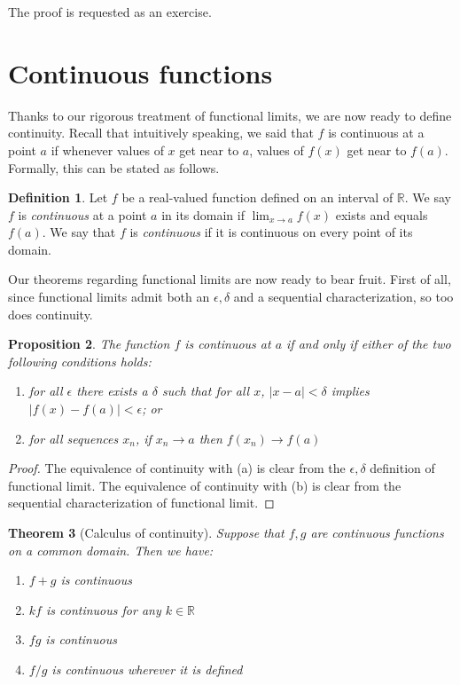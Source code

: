 \documentclass[11pt,oneside]{amsbook}
\newcommand{\RR}{\mathbb R}
\theoremstyle{definition}
\theoremstyle{plain}
\newtheorem{thm}{Theorem}[section]
\newtheorem{prop}[thm]{Proposition}
\theoremstyle{definition}
\newtheorem{defn}[thm]{Definition}
\theoremstyle{remark}
\numberwithin{equation}{section}
\numberwithin{figure}{section}
\begin{document}
The proof is requested as an exercise.

\newpage
\section{Continuous functions}

Thanks to our rigorous treatment of functional limits, we are now ready to define continuity. Recall that intuitively speaking, we said that $f$ is continuous at a point $a$ if whenever values of $x$ get near to $a$, values of $f(x)$ get near to $f(a)$. Formally, this can be stated as follows.

\begin{defn}
  Let $f$ be a real-valued function defined on an interval of $\RR$. We say $f$ is \emph{continuous} at a point $a$ in its domain if $\lim_{x\to a}f(x)$ exists and equals $f(a)$. We say that $f$ is \emph{continuous} if it is continuous on every point of its domain.
\end{defn}

Our theorems regarding functional limits are now ready to bear fruit. First of all, since functional limits admit both an $\epsilon,\delta$ and a sequential characterization, so too does continuity.

\begin{prop}
  The function $f$ is continuous at $a$ if and only if either of the two following conditions holds:
  \begin{enumerate}
  \item for all $\epsilon$ there exists a $\delta$ such that for all $x$, $|x-a|<\delta$ implies $|f(x)-f(a)|<\epsilon$; or
  \item for all sequences $x_n$, if $x_n\to a$ then $f(x_n)\to f(a)$
  \end{enumerate}
\end{prop}  

\begin{proof}
  The equivalence of continuity with (a) is clear from the $\epsilon,\delta$ definition of functional limit. The equivalence of continuity with (b) is clear from the sequential characterization of functional limit.
\end{proof}

\begin{thm}[Calculus of continuity]
  Suppose that $f,g$ are continuous functions on a common domain. Then we have:
  \begin{enumerate}
  \item $f+g$ is continuous
  \item $kf$ is continuous for any $k\in\RR$
  \item $fg$ is continuous
  \item $f/g$ is continuous wherever it is defined
  \end{enumerate}
\end{thm}
\end{document}
